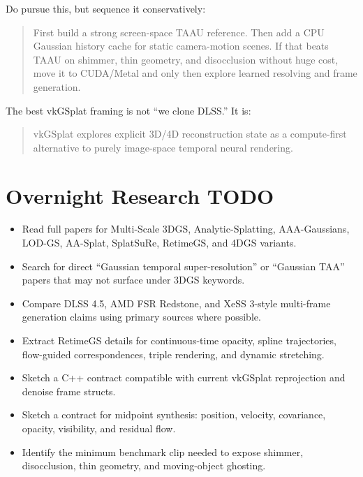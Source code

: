 \documentclass[11pt]{article}
\begin{document}
Do pursue this, but sequence it conservatively:

\begin{quote}
First build a strong screen-space TAAU reference. Then add a CPU Gaussian
history cache for static camera-motion scenes. If that beats TAAU on shimmer,
thin geometry, and disocclusion without huge cost, move it to CUDA/Metal and
only then explore learned resolving and frame generation.
\end{quote}

The best vkGSplat framing is not ``we clone DLSS.'' It is:

\begin{quote}
vkGSplat explores explicit 3D/4D reconstruction state as a compute-first
alternative to purely image-space temporal neural rendering.
\end{quote}

\section{Overnight Research TODO}

\begin{itemize}
  \item Read full papers for Multi-Scale 3DGS, Analytic-Splatting,
        AAA-Gaussians, LOD-GS, AA-Splat, SplatSuRe, RetimeGS, and 4DGS variants.
  \item Search for direct ``Gaussian temporal super-resolution'' or
        ``Gaussian TAA'' papers that may not surface under 3DGS keywords.
  \item Compare DLSS 4.5, AMD FSR Redstone, and XeSS 3-style multi-frame
        generation claims using primary sources where possible.
  \item Extract RetimeGS details for continuous-time opacity, spline
        trajectories, flow-guided correspondences, triple rendering, and
        dynamic stretching.
  \item Sketch a  C++ contract compatible with
        current vkGSplat reprojection and denoise frame structs.
  \item Sketch a  contract for midpoint synthesis:
        position, velocity, covariance, opacity, visibility, and residual flow.
  \item Identify the minimum benchmark clip needed to expose shimmer,
        disocclusion, thin geometry, and moving-object ghosting.
\end{itemize}
\end{document}
